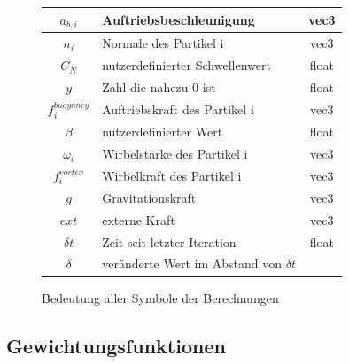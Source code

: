 \documentclass[intern,palatino]{cgBA}
\begin{document}
\begin{figure}
\begin{tabular}{ | c | p{8cm} | c |}
			$a_{b,i} $ 	  		&  Auftriebsbeschleunigung							&	vec3	\\ \hline
			$n_i $ 				&  Normale des Partikel i							&	vec3	\\ \hline
			$C_N $ 				&  nutzerdefinierter Schwellenwert					&	float	\\ \hline
			$y $ 				&  Zahl die nahezu 0 ist					 		&	float	\\ \hline
			$f^{buoyancy}_i $ 	&  Auftriebskraft des Partikel i					&	vec3	\\ \hline
			$\beta $ 			&  nutzerdefinierter Wert							&	float	\\ \hline
			$\omega_i $ 		&  Wirbelstärke des Partikel i						&	vec3	\\ \hline
			$f^{vortex}_i $ 	&  Wirbelkraft des Partikel i						&	vec3	\\ \hline
			$g $ 				&  Gravitationskraft								&	vec3	\\ \hline
			$ext $ 				&  externe Kraft									&	vec3	\\ \hline
			$\delta t $ 		&  Zeit seit letzter Iteration 						&	float	\\ \hline
			$\delta $ 			&  veränderte Wert im Abstand von $\delta t$ 		&			\\
			\hline
		\end{tabular}
	\caption{Bedeutung aller Symbole der Berechnungen}
	\label{tab:Symbole}
\end{figure}


\subsection{Gewichtungsfunktionen}\label{kernel}
\end{document}
